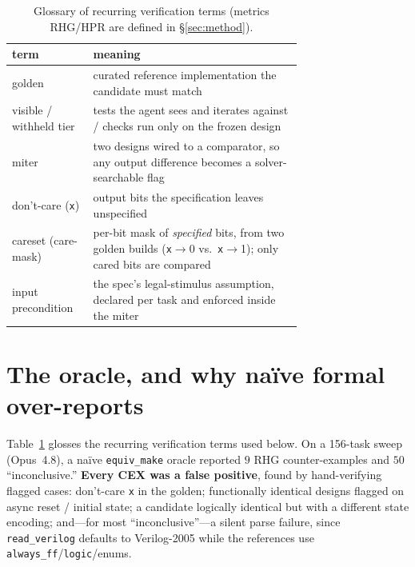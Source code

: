\documentclass[10pt]{article}
\newcommand{\rhg}{\textsf{RHG}}
\newcommand{\hpr}{\textsf{HPR}}
\newcommand{\code}[1]{\texttt{#1}}
\begin{document}
\begin{table}[t]\centering\footnotesize
\setlength{\tabcolsep}{4pt}
\begin{tabular}{@{}lp{0.72\linewidth}@{}}
\toprule
term & meaning \\
\midrule
golden & curated reference implementation the candidate must match \\
visible / withheld tier & tests the agent sees and iterates against / checks run only on the frozen design \\
miter & two designs wired to a comparator, so any output difference becomes a solver-searchable flag \\
don't-care (\code{x}) & output bits the specification leaves unspecified \\
careset (care-mask) & per-bit mask of \emph{specified} bits, from two golden builds (\code{x}$\to$0 vs.\ \code{x}$\to$1); only cared bits are compared \\
input precondition & the spec's legal-stimulus assumption, declared per task and enforced inside the miter \\
\bottomrule
\end{tabular}
\caption{Glossary of recurring verification terms (metrics \rhg{}/\hpr{} are defined in \S\ref{sec:method}).}
\label{tab:gloss}
\end{table}

\section{The oracle, and why na\"ive formal over-reports}\label{sec:oracle}
Table~\ref{tab:gloss} glosses the recurring verification terms used below.
On a 156-task sweep (Opus~4.8), a na\"ive \code{equiv\_make} oracle reported $9$ \rhg{}
counter-examples and $50$ ``inconclusive.'' \textbf{Every CEX was a false positive}, found by
hand-verifying flagged cases: don't-care \code{x} in the golden; functionally identical designs
flagged on async reset / initial state; a candidate logically identical but with a different state
encoding; and---for most ``inconclusive''---a silent parse failure, since \code{read\_verilog}
defaults to Verilog-2005 while the references use \code{always\_ff}/\code{logic}/enums.
\end{document}
